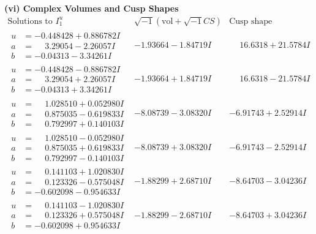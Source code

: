 \documentclass[1p]{elsarticle_modified}
\theoremstyle{definition}
\newcommand{\I}{\sqrt{-1}}
\begin{document}
\newpage\flushleft \textbf{(vi) Complex Volumes and Cusp Shapes}
$$\begin{array}{c|c|c}  
\text{Solutions to }I^u_{1}& \I (\text{vol} + \sqrt{-1}CS) & \text{Cusp shape}\\
 \hline 
\begin{aligned}
u &= -0.448428 + 0.886782 I \\
a &= \phantom{-}3.29054 - 2.26057 I \\
b &= -0.04313 - 3.34261 I\end{aligned}
 & -1.93664 - 1.84719 I & \phantom{-}16.6318 + 21.5784 I \\ \hline\begin{aligned}
u &= -0.448428 - 0.886782 I \\
a &= \phantom{-}3.29054 + 2.26057 I \\
b &= -0.04313 + 3.34261 I\end{aligned}
 & -1.93664 + 1.84719 I & \phantom{-}16.6318 - 21.5784 I \\ \hline\begin{aligned}
u &= \phantom{-}1.028510 + 0.052980 I \\
a &= \phantom{-}0.875035 - 0.619833 I \\
b &= \phantom{-}0.792997 + 0.140103 I\end{aligned}
 & -8.08739 - 3.08320 I & -6.91743 + 2.52914 I \\ \hline\begin{aligned}
u &= \phantom{-}1.028510 - 0.052980 I \\
a &= \phantom{-}0.875035 + 0.619833 I \\
b &= \phantom{-}0.792997 - 0.140103 I\end{aligned}
 & -8.08739 + 3.08320 I & -6.91743 - 2.52914 I \\ \hline\begin{aligned}
u &= \phantom{-}0.141103 + 1.020830 I \\
a &= \phantom{-}0.123326 - 0.575048 I \\
b &= -0.602098 - 0.954633 I\end{aligned}
 & -1.88299 + 2.68710 I & -8.64703 - 3.04236 I \\ \hline\begin{aligned}
u &= \phantom{-}0.141103 - 1.020830 I \\
a &= \phantom{-}0.123326 + 0.575048 I \\
b &= -0.602098 + 0.954633 I\end{aligned}
 & -1.88299 - 2.68710 I & -8.64703 + 3.04236 I \\ \hline\begin{aligned}

\end{aligned}
\end{array}$$
\end{document}
